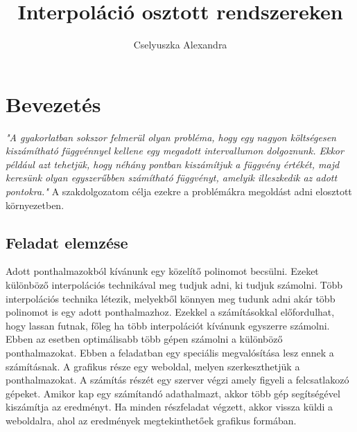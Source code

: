 \documentclass{elteikthesis}
\title{Interpoláció osztott rendszereken}
\author{Cselyuszka Alexandra}
\begin{document}
\frontmatter

	\maketitle

\mainmatter

\tableofcontents
	
\chapter{Bevezetés} 

\textit{
"A gyakorlatban sokszor felmerül olyan probléma, hogy egy nagyon költségesen kiszámítható függvénnyel kellene egy megadott intervallumon dolgoznunk. Ekkor például azt tehetjük, hogy néhány pontban kiszámítjuk a függvény értékét, majd keresünk olyan egyszerűbben számítható függvényt, amelyik illeszkedik az adott pontokra." 	}
\cite{numanalbev}
\newline
\newline
A szakdolgozatom célja ezekre a problémákra megoldást adni elosztott környezetben. 
\section{Feladat elemzése}
Adott ponthalmazokból kívánunk egy közelítő polinomot becsülni. Ezeket különböző interpolációs technikával meg tudjuk adni, ki tudjuk számolni. Több interpolációs technika létezik, melyekből könnyen meg tudunk adni akár több polinomot is egy adott ponthalmazhoz.\newline
Ezekkel a számításokkal előfordulhat, hogy lassan futnak, főleg ha több interpolációt kívánunk egyszerre számolni.
Ebben az esetben optimálisabb több gépen számolni a különböző ponthalmazokat.
\newline\newline
Ebben a feladatban egy speciális megvalósítása lesz ennek a számításnak. \newline
A grafikus része egy weboldal, melyen szerkeszthetjük a ponthalmazokat. A számítás részét egy szerver végzi amely figyeli a felcsatlakozó gépeket. Amikor kap egy számítandó adathalmazt, akkor több gép segítségével kiszámítja az eredményt. Ha minden részfeladat végzett, akkor vissza küldi a weboldalra, ahol az eredmények megtekinthetőek grafikus formában.
\newline\newline
\end{document}
